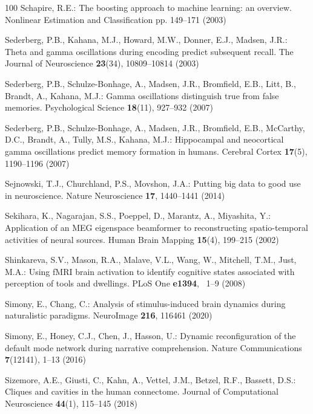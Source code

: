 \documentclass{llmxive}
\begin{document}
\begin{thebibliography}{100}
Schapire, R.E.: The boosting approach to machine learning: an overview.
  Nonlinear Estimation and Classification pp. 149--171 (2003)

Sederberg, P.B., Kahana, M.J., Howard, M.W., Donner, E.J., Madsen, J.R.: Theta
  and gamma oscillations during encoding predict subsequent recall. The Journal
  of Neuroscience  \textbf{23}(34),  10809--10814 (2003)

Sederberg, P.B., Schulze-Bonhage, A., Madsen, J.R., Bromfield, E.B., Litt, B.,
  Brandt, A., Kahana, M.J.: Gamma oscillations distinguish true from false
  memories. Psychological Science  \textbf{18}(11),  927--932 (2007)

Sederberg, P.B., Schulze-Bonhage, A., Madsen, J.R., Bromfield, E.B., McCarthy,
  D.C., Brandt, A., Tully, M.S., Kahana, M.J.: Hippocampal and neocortical
  gamma oscillations predict memory formation in humans. Cerebral Cortex
  \textbf{17}(5),  1190--1196 (2007)

Sejnowski, T.J., Churchland, P.S., Movshon, J.A.: Putting big data to good use
  in neuroscience. Nature Neuroscience  \textbf{17},  1440--1441 (2014)

Sekihara, K., Nagarajan, S.S., Poeppel, D., Marantz, A., Miyashita, Y.:
  Application of an {MEG} eigenspace beamformer to reconstructing
  spatio-temporal activities of neural sources. Human Brain Mapping
  \textbf{15}(4),  199--215 (2002)

Shinkareva, S.V., Mason, R.A., Malave, V.L., Wang, W., Mitchell, T.M., Just,
  M.A.: Using {fMRI} brain activation to identify cognitive states associated
  with perception of tools and dwellings. {PLoS} One  \textbf{e1394}, ~1--9
  (2008)

Simony, E., Chang, C.: Analysis of stimulus-induced brain dynamics during
  naturalistic paradigms. {NeuroImage}  \textbf{216},  116461 (2020)

Simony, E., Honey, C.J., Chen, J., Hasson, U.: Dynamic reconfiguration of the
  default mode network during narrative comprehension. Nature Communications
  \textbf{7}(12141),  1--13 (2016)

Sizemore, A.E., Giusti, C., Kahn, A., Vettel, J.M., Betzel, R.F., Bassett,
  D.S.: Cliques and cavities in the human connectome. Journal of Computational
  Neuroscience  \textbf{44}(1),  115--145 (2018)


\end{thebibliography}
\end{document}
